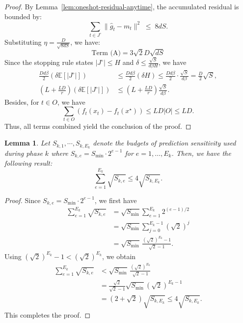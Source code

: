 \documentclass[journal,onecolumn]{IEEEtran}
\theoremstyle{plain}
\newtheorem{lemma}[theorem]{Lemma}
\theoremstyle{definition}
\theoremstyle{remark}
\begin{document}
{\begin{proof}
    By Lemma~\ref{lem:oneshot-residual-anytime}, the accumulated residual is bounded by:
    \begin{equation*}
        \sum_{t\in J^{\circ}}\|\hat g_{t}-m_{t}\|^{2} \;\le\; 8dS.
    \end{equation*}
    Substituting $\eta = \frac{D}{\sqrt{8dS}}$, we have:
    \begin{equation*}
        \text{Term (A)}=3\sqrt{2}D\sqrt{dS}
    \end{equation*}
    Since the stopping rule states $|J^{\circ}| \le H$ and
    $\delta\leq \frac{\sqrt{S}}{d\beta H}$, we have
    \begin{align*}
        \frac{Dd\beta}{2}(\delta \mathbb{E}[|J^{\circ}|])            & \le \frac{Dd\beta}{2}(\delta H) \le \frac{Dd\beta}{2}\cdot \frac{\sqrt{S}}{d\beta}= \frac{D}{2}\sqrt{S}, \\
        \left(L+\frac{LD}{r}\right) (\delta \mathbb{E}[|J^{\circ}|]) & \le \left(L+\frac{LD}{r}\right) \frac{\sqrt{S}}{d\beta}.
    \end{align*}
    Besides, for $t\in O$, we have 
    \begin{equation*}
        \sum_{t\in O}(f_t(x_t)-f_t(x^\star))\leq LD|O|\leq LD.
    \end{equation*}
    Thus, all terms combined yield the conclusion of the proof.
\end{proof}

\begin{lemma}\label{lem:sum-epochs-in-phase}
Let $S_{k,1},\cdots,S_{k,E_k}$ denote the budgets of prediction sensitivity used during phase $k$ where $S_{k,e}=S_{\min}\cdot2^{e-1}$ for $e=1,\ldots,E_k$. Then, we have the following result:
\begin{equation*}
    \sum_{e=1}^{E_k}\sqrt{S_{k,e}}
    \le 4\sqrt{S_{k,E_k}}.
\end{equation*}
\end{lemma}

\begin{proof}
Since $S_{k,e}=S_{\min}\cdot2^{e-1}$, we first have
\begin{equation*}
\begin{aligned}
    \sum_{e=1}^{E_k}\sqrt{S_{k,e}}
    &=
    \sqrt{S_{\min}}
    \sum_{e=1}^{E_k}2^{(e-1)/2}  \\
    &=
    \sqrt{S_{\min}}
    \sum_{j=0}^{E_k-1}(\sqrt{2})^j  \\
    &=
    \sqrt{S_{\min}}\,
    \frac{(\sqrt{2})^{E_k}-1}{\sqrt{2}-1}.
\end{aligned}
\end{equation*}
Using $(\sqrt{2})^{E_k}-1<(\sqrt{2})^{E_k}$, we obtain
\begin{equation*}
\begin{aligned}
    \sum_{e=1}^{E_k}\sqrt{S_{k,e}}
    &<
    \sqrt{S_{\min}}\,
    \frac{(\sqrt{2})^{E_k}}{\sqrt{2}-1}  \\
    &=
    \frac{\sqrt{2}}{\sqrt{2}-1}
    \sqrt{S_{\min}}(\sqrt{2})^{E_k-1}  \\
    &=
    (2+\sqrt{2})\sqrt{S_{k,E_k}}
    \le 4\sqrt{S_{k,E_k}} .
\end{aligned}
\end{equation*}
This completes the proof.
\end{proof}

}
\end{document}
